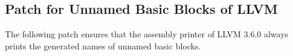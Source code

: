 
\subsection{Patch for Unnamed Basic Blocks of LLVM}
\label{app:unnamed_patch}

The following patch ensures that the assembly printer of LLVM 3.6.0 always prints the generated names of unnamed basic blocks.


